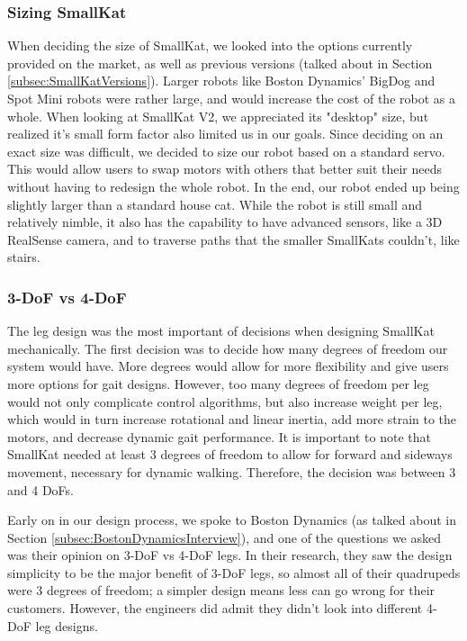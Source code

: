         \subsubsection{Sizing SmallKat}
            When deciding the size of SmallKat, we looked into the options currently provided on the market, as well as previous versions (talked about in Section \ref{subsec:SmallKatVersions}). Larger robots like Boston Dynamics' BigDog and Spot Mini robots were rather large, and would increase the cost of the robot as a whole. When looking at SmallKat V2, we appreciated its "desktop" size, but realized it's small form factor also limited us in our goals. Since deciding on an exact size was difficult, we decided to size our robot based on a standard servo. This would allow users to swap motors with others that better suit their needs without having to redesign the whole robot. In the end, our robot ended up being slightly larger than a standard house cat. While the robot is still small and relatively nimble, it also has the capability to have advanced sensors, like a 3D RealSense camera, and to traverse paths that the smaller SmallKats couldn't, like stairs.

        \subsubsection{3-DoF vs 4-DoF}
            The leg design was the most important of decisions when designing SmallKat mechanically. The first decision was to decide how many degrees of freedom our system would have. More degrees would allow for more flexibility and give users more options for gait designs. However, too many degrees of freedom per leg would not only complicate control algorithms, but also increase weight per leg, which would in turn increase rotational and linear inertia, add more strain to the motors, and decrease dynamic gait performance. It is important to note that SmallKat needed at least 3 degrees of freedom to allow for forward and sideways movement, necessary for dynamic walking. Therefore, the decision was between 3 and 4 DoFs.

            Early on in our design process, we spoke to Boston Dynamics (as talked about in Section \ref{subsec:BostonDynamicsInterview}), and one of the questions we asked was their opinion on 3-DoF vs 4-DoF legs. In their research, they saw the design simplicity to be the major benefit of 3-DoF legs, so almost all of their quadrupeds were 3 degrees of freedom; a simpler design means less can go wrong for their customers. However, the engineers did admit they didn't look into different 4-DoF leg designs.

